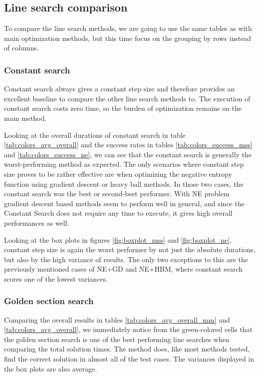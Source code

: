 \documentclass[english, 12pt, a4paper, sci, utf8, a-1b, online, table]{aaltothesis}
\begin{document}
\subsection{Line search comparison}


To compare the line search methods, we are going to use the same tables as with main optimization methods, but this time focus on the grouping by rows instead of columns.

\subsubsection*{Constant search}

Constant search always gives a constant step size and therefore provides an excellent baseline to compare the other line search methods to. The execution of constant search costs zero time, so the burden of optimization remains on the main method.

Looking at the overall durations of constant search in table \ref{tab:colors_avg_overall} and the success rates in tables \ref{tab:colors_success_mss} and \ref{tab:colors_success_ne}, we can see that the constant search is generally the worst-performing method as expected. The only scenarios where constant step size proves to be rather effective are when optimizing the negative entropy function using gradient descent or heavy ball methods. In those two cases, the constant search was the best or second-best performer. With NE problem gradient descent based methods seem to perform well in general, and since the Constant Search does not require any time to execute, it gives high overall performances as well.

Looking at the box plots in figures \ref{fig:boxplot_mss} and \ref{fig:boxplot_ne}, constant step size is again the worst performer by not just the absolute durations, but also by the high variance of results. The only two exceptions to this are the previously mentioned cases of NE+GD and NE+HBM, where constant search scores one of the lowest variances.

\subsubsection*{Golden section search}

Comparing the overall results in tables \ref{tab:colors_avg_overall_mm} and \ref{tab:colors_avg_overall}, we immediately notice from the green-colored cells that the golden section search is one of the best performing line searches when comparing the total solution times. The method does, like most methods tested, find the correct solution in almost all of the test cases. The variances displayed in the box plots are also average. 
\end{document}
